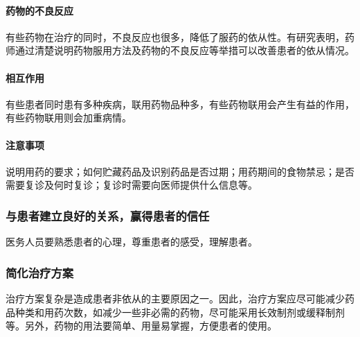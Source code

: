 \paragraph{药物的不良反应}

有些药物在治疗的同时，不良反应也很多，降低了服药的依从性。有研究表明，药师通过清楚说明药物服用方法及药物的不良反应等举措可以改善患者的依从情况。
\paragraph{相互作用}

有些患者同时患有多种疾病，联用药物品种多，有些药物联用会产生有益的作用，有些药物联用则会加重病情。
\paragraph{注意事项}

说明用药的要求；如何贮藏药品及识别药品是否过期；用药期间的食物禁忌；是否需要复诊及何时复诊；复诊时需要向医师提供什么信息等。

\subsubsection{与患者建立良好的关系，赢得患者的信任}

医务人员要熟悉患者的心理，尊重患者的感受，理解患者。

\subsubsection{简化治疗方案}

治疗方案复杂是造成患者非依从的主要原因之一。因此，治疗方案应尽可能减少药品种类和用药次数，如减少一些非必需的药物，尽可能采用长效制剂或缓释制剂等。另外，药物的用法要简单、用量易掌握，方便患者的使用。